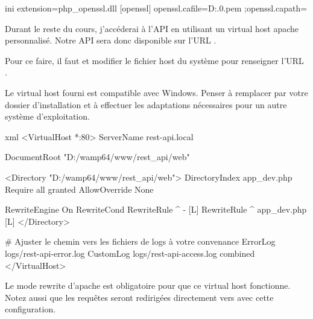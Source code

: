 \documentclass[big]{zmdocument}
\begin{document}
\begin{CodeBlock}{ini}
extension=php_openssl.dll
[openssl]
openssl.cafile=D:\bin\php{}.0\cacert.pem
;openssl.capath=
\end{CodeBlock}





Durant le reste du cours, j'accéderai à l'API en utilisant un virtual host apache personnalisé. Notre API sera donc disponible sur l'URL .



Pour ce faire, il faut  et modifier le fichier host du système pour renseigner l'URL .



\begin{Information}
Le virtual host fourni est compatible avec Windows. Penser à remplacer  par votre dossier d'installation et à effectuer les adaptations nécessaires pour un autre système d'exploitation.
\end{Information}


\begin{CodeBlock}{xml}
<VirtualHost *:80>
    ServerName rest-api.local

    DocumentRoot "D:/wamp64/www/rest_api/web"

    <Directory "D:/wamp64/www/rest_api/web">
      DirectoryIndex app_dev.php
      Require all granted
      AllowOverride None

      RewriteEngine On
      RewriteCond %
      RewriteRule ^ - [L]
      RewriteRule ^ app_dev.php [L]
    </Directory>

    # Ajuster le chemin vers les fichiers de logs à votre convenance
    ErrorLog logs/rest-api-error.log 
    CustomLog logs/rest-api-access.log combined
</VirtualHost>
\end{CodeBlock}



\begin{Warning}
Le mode rewrite d'apache est obligatoire pour que ce virtual host fonctionne. Notez aussi que les requêtes seront redirigées directement vers  avec cette configuration.
\end{Warning}
\end{document}
